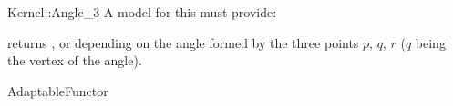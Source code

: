 \begin{ccRefFunctionObjectConcept}{Kernel::Angle_3}
A model for this must provide:


{returns ,  or  depending
on the angle formed by the three points $p$, $q$, $r$ ($q$ being the vertex of
the angle).}

\ccRefines
AdaptableFunctor

\ccSeeAlso
{} \\

\end{ccRefFunctionObjectConcept}

